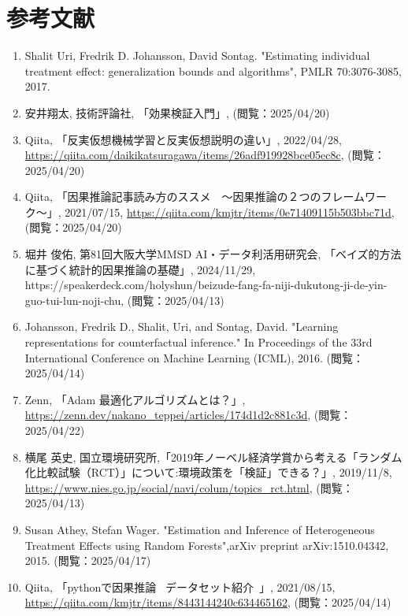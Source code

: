 \documentclass[dvipdfmx]{jreport}
\begin{document}
\section{参考文献}
\begin{enumerate}
    \renewcommand{\labelenumi}{[\theenumi]}
    \item \label{元論} Shalit Uri, Fredrik D. Johansson, David Sontag. "Estimating individual treatment effect: generalization bounds and algorithms", PMLR 70:3076-3085, 2017.
    \item \label{因果推論} 安井翔太, 技術評論社, 「効果検証入門」, (閲覧：2025/04/20)
    \item \label{反実仮想} Qiita, 「反実仮想機械学習と反実仮想説明の違い」, 2022/04/28, \url{https://qiita.com/daikikatsuragawa/items/26adf919928bce05ec8c}, (閲覧：2025/04/20)
    \item \label{ルービン} Qiita, 「因果推論記事読み方のススメ　〜因果推論の２つのフレームワーク〜」, 2021/07/15, \url{https://qiita.com/kmjtr/items/0e71409115b503bbc71d}, (閲覧：2025/04/20)
    \item \label{データ科学} 堀井 俊佑, 第81回大阪大学MMSD AI・データ利活用研究会, 「ベイズ的方法に基づく統計的因果推論の基礎」, 2024/11/29, https://speakerdeck.com/holyshun/beizude-fang-fa-niji-dukutong-ji-de-yin-guo-tui-lun-noji-chu, (閲覧：2025/04/13)
    \item \label{bnn}Johansson, Fredrik D., Shalit, Uri, and Sontag, David. "Learning representations for counterfactual inference." In Proceedings of the 33rd International Conference on Machine Learning (ICML), 2016.  (閲覧：2025/04/14)
    \item \label{adam} Zenn, 「Adam 最適化アルゴリズムとは？」, \url{https://zenn.dev/nakano_teppei/articles/174d1d2c881c3d}, (閲覧：2025/04/22)
    \item \label{rct} 横尾 英史, 国立環境研究所,「2019年ノーベル経済学賞から考える「ランダム化比較試験（RCT）」について:環境政策を「検証」できる？」, 2019/11/8, \url{https://www.nies.go.jp/social/navi/colum/topics_rct.html}, (閲覧：2025/04/13)
    \item \label{因果フォレスト} Susan Athey, Stefan Wager. "Estimation and Inference of Heterogeneous Treatment Effects using Random Forests",arXiv preprint arXiv:1510.04342, 2015. (閲覧：2025/04/17)
    \item \label{data}Qiita, 「pythonで因果推論 ~データセット紹介~」, 2021/08/15, \url{https://qiita.com/kmjtr/items/8443144240c634465162}, (閲覧：2025/04/14)
\end{enumerate}
\end{document}
